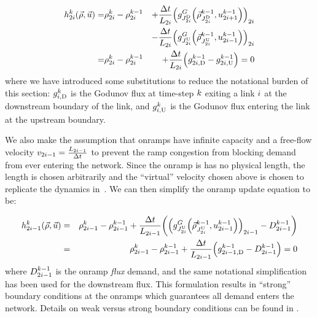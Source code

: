 \begin{eqnarray}
\syseq_{2\link}^{\tind}(\state,\control)= & \discrete{2\link}{\tind}-\discrete{2\link}{\tind-1} & +\dfrac{\Delta t}{\length_{2\link}}\left(\god_{\jdown{2\link}}\left(\juncstate{\jdown{2\link}}{\tind-1},\ramp_{2\link+1}^{\tind-1}\right)\right)_{2\link}\label{eq:rho-update}\\
 &  & -\dfrac{\Delta t}{\length_{2\link}}\left(\god_{\jup{2\link}}\left(\juncstate{\jup{2\link}}{\tind-1},\ramp_{2\link-1}^{\tind-1}\right)\right)_{2\link}\nonumber \\
= & \discrete{2\link}{\tind}-\discrete{2\link}{\tind-1} & +\frac{\Delta t}{\length_{2\link}}\left(\fout{2\link}{\tind-1}-\fin{2\link}{\tind-1}\right)=0
\end{eqnarray}
where we have introduced some substitutions to reduce the notational
burden of this section: $g_{i,\text{D}}^{k}$ is the Godunov flux
at time-step $k$ exiting a link $i$ at the downstream boundary
of the link, and $g_{i,\text{U}}^{k}$ is the Godunov flux entering
the link at the upstream boundary.

We also make the assumption that onramps have infinite capacity and
a free-flow velocity $v_{2i-1}=\frac{L_{2i-1}}{\Delta t}$
to prevent the ramp congestion from blocking demand from ever entering
the network. Since the onramp is has no physical length, the length
is chosen arbitrarily and the ``virtual'' velocity chosen above
is chosen to replicate the dynamics in~\cite{Monache2013}. We can
then simplify the onramp update equation to be:

\begin{eqnarray}
\syseq_{2\link-1}^{\tind}(\state,\control) & = & \discrete{2\link-1}{\tind}-\discrete{2\link-1}{\tind-1}+\frac{\Delta t}{\length_{2\link-1}}\left(\left(\god_{\jup{2\link}}\left(\juncstate{\jup{2\link}}{\tind-1},\ramp_{2\link-1}^{\tind-1}\right)\right)_{2\link-1}-\boundaryDemand{2\link-1}{\tind-1}\right)\label{eq:onramp-update}\\
 & = & \discrete{2\link-1}{\tind}-\discrete{2\link-1}{\tind-1}+\frac{\Delta t}{\length_{2\link-1}}\left(\fout{2\link-1}{\tind-1}-\boundaryDemand{2\link-1}{\tind-1}\right)=0
\end{eqnarray}
where $D_{2i-1}^{k-1}$ is the onramp \emph{flux
}demand, and the same notational simplification has been used for
the downstream flux. This formulation results in ``strong'' boundary
conditions at the onramps which guarantees all demand enters the network.
Details on weak versus strong boundary conditions can be found in
\cite{Monache2013,Walid,strub2006weak,work2010traffic}.

